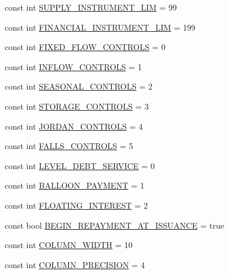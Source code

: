 \begin{DoxyCompactItemize}
const int \mbox{\hyperlink{namespaceConstants_a0dbf27e9d760dfcdbde4c841e74bbf78}{S\+U\+P\+P\+L\+Y\+\_\+\+I\+N\+S\+T\+R\+U\+M\+E\+N\+T\+\_\+\+L\+IM}} = 99
\item 
const int \mbox{\hyperlink{namespaceConstants_a4f863f4b075dd82d9c79710fa7437734}{F\+I\+N\+A\+N\+C\+I\+A\+L\+\_\+\+I\+N\+S\+T\+R\+U\+M\+E\+N\+T\+\_\+\+L\+IM}} = 199
\item 
const int \mbox{\hyperlink{namespaceConstants_ad8ac2a802acc9bbd547c676255692ff3}{F\+I\+X\+E\+D\+\_\+\+F\+L\+O\+W\+\_\+\+C\+O\+N\+T\+R\+O\+LS}} = 0
\item 
const int \mbox{\hyperlink{namespaceConstants_af73061aaa392892f65f5070d7a979895}{I\+N\+F\+L\+O\+W\+\_\+\+C\+O\+N\+T\+R\+O\+LS}} = 1
\item 
const int \mbox{\hyperlink{namespaceConstants_a8e78b56c12f7896c4b1f225503172634}{S\+E\+A\+S\+O\+N\+A\+L\+\_\+\+C\+O\+N\+T\+R\+O\+LS}} = 2
\item 
const int \mbox{\hyperlink{namespaceConstants_ae986af9edd51d442ce78589435ddbf0b}{S\+T\+O\+R\+A\+G\+E\+\_\+\+C\+O\+N\+T\+R\+O\+LS}} = 3
\item 
const int \mbox{\hyperlink{namespaceConstants_ae35241b436f7a539f367f08b0f9fa9f1}{J\+O\+R\+D\+A\+N\+\_\+\+C\+O\+N\+T\+R\+O\+LS}} = 4
\item 
const int \mbox{\hyperlink{namespaceConstants_a9ced0b193590ae665ccefc280837464d}{F\+A\+L\+L\+S\+\_\+\+C\+O\+N\+T\+R\+O\+LS}} = 5
\item 
const int \mbox{\hyperlink{namespaceConstants_a4b19c9668b1dd7c3cf77b16029fe3cac}{L\+E\+V\+E\+L\+\_\+\+D\+E\+B\+T\+\_\+\+S\+E\+R\+V\+I\+CE}} = 0
\item 
const int \mbox{\hyperlink{namespaceConstants_a08c9220e91237a5b58d648fb4298833c}{B\+A\+L\+L\+O\+O\+N\+\_\+\+P\+A\+Y\+M\+E\+NT}} = 1
\item 
const int \mbox{\hyperlink{namespaceConstants_aaa7f6235ee94070b06f049654312a63e}{F\+L\+O\+A\+T\+I\+N\+G\+\_\+\+I\+N\+T\+E\+R\+E\+ST}} = 2
\item 
const bool \mbox{\hyperlink{namespaceConstants_a603925d07357a01d9531549e46b2936c}{B\+E\+G\+I\+N\+\_\+\+R\+E\+P\+A\+Y\+M\+E\+N\+T\+\_\+\+A\+T\+\_\+\+I\+S\+S\+U\+A\+N\+CE}} = true
\item 
const int \mbox{\hyperlink{namespaceConstants_ab7a5abf9228bcce4babf9a84cd66deb1}{C\+O\+L\+U\+M\+N\+\_\+\+W\+I\+D\+TH}} = 10
\item 
const int \mbox{\hyperlink{namespaceConstants_a52f7a9d94123775aa42a979c4c97dc71}{C\+O\+L\+U\+M\+N\+\_\+\+P\+R\+E\+C\+I\+S\+I\+ON}} = 4
\item 

\end{DoxyCompactItemize}
